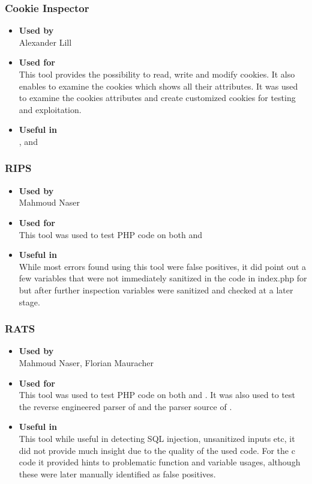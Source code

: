 \subsubsection*{Cookie Inspector}
\begin{itemize}
	\item \textbf{Used by}\\ Alexander Lill
	\item \textbf{Used for}\\
	This tool provides the possibility to read, write and modify cookies. It also enables to examine the cookies which shows all their attributes. It was used to examine the cookies attributes and create customized cookies for testing and exploitation.
	\item \textbf{Useful in}\\ ,  and 
\end{itemize}

\subsubsection*{RIPS}
\begin{itemize}
	\item \textbf{Used by}\\ Mahmoud Naser
	\item \textbf{Used for}\\ This tool was used to test PHP code on both \bs{} and \gnb{}

	\item \textbf{Useful in}\\ 	While most errors found using this tool were false positives, it did point out a few variables that were not immediately sanitized in the code in index.php for \bs{} but after further inspection variables were sanitized and checked at a later stage.
\end{itemize}

\subsubsection*{RATS}
\begin{itemize}
	\item \textbf{Used by}\\ Mahmoud Naser, Florian Mauracher
	\item \textbf{Used for}\\ This tool was used to test PHP code on both \bs{} and \gnb{}. It was also used to test the reverse engineered parser of \bs{} and the parser source of \gnb{}.
	\item \textbf{Useful in}\\ This tool while useful in detecting SQL injection, unsanitized inputs etc, it did not provide much insight due to the quality of the used code.
		For the c code it provided hints to problematic function and variable usages, although these were later manually identified as false positives.
\end{itemize}

